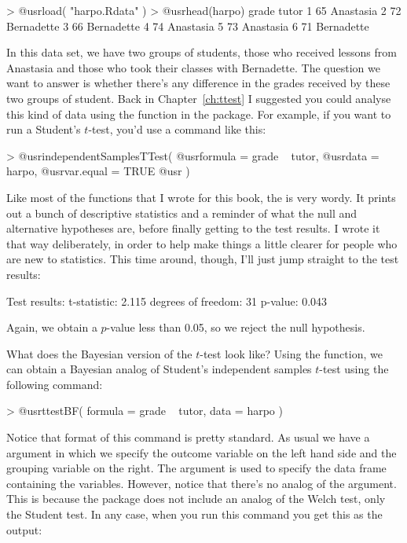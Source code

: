 \begin{rblock1}
> @usr{load( "harpo.Rdata" )}
> @usr{head(harpo)}
  grade      tutor
1    65  Anastasia
2    72 Bernadette
3    66 Bernadette
4    74  Anastasia
5    73  Anastasia
6    71 Bernadette
\end{rblock1}

\noindent
In this data set, we have two groups of students, those who received lessons from Anastasia and those who took their classes with Bernadette. The question we want to answer is whether there's any difference in the grades received by these two groups of student. Back in Chapter~\ref{ch:ttest} I suggested you could analyse this kind of data using the  function in the  package. For example, if you want to run a Student's $t$-test, you'd use a command like this:
\begin{rblock1}
> @usr{independentSamplesTTest(}
    @usr{formula = grade ~ tutor,} 
    @usr{data = harpo,} 
    @usr{var.equal = TRUE} 
@usr{ )}
\end{rblock1}
Like most of the functions that I wrote for this book, the  is very wordy. It prints out a bunch of descriptive statistics and a reminder of what the null and alternative hypotheses are, before finally getting to the test results. I wrote it that way deliberately, in order to help make things a little clearer for people who are new to statistics. This time around, though, I'll just jump straight to the test results:
\begin{rblock1}
Test results: 
   t-statistic:  2.115 
   degrees of freedom:  31 
   p-value:  0.043 
\end{rblock1}
Again, we obtain a $p$-value less than 0.05, so we reject the null hypothesis. 

What does the Bayesian version of the $t$-test look like? Using the  function, we can obtain a Bayesian analog of Student's independent samples $t$-test using the following command:
\begin{rblock1}
> @usr{ttestBF( formula = grade ~ tutor, data = harpo )}
\end{rblock1}
Notice that format of this command is pretty standard. As usual we have a  argument in which we specify the outcome variable on the left hand side and the grouping variable on the right. The  argument is used to specify the data frame containing the variables. However, notice that there's no analog of the  argument. This is because the  package does not include an analog of the Welch test, only the Student test. In any case, when you run this command you get this as the output:

